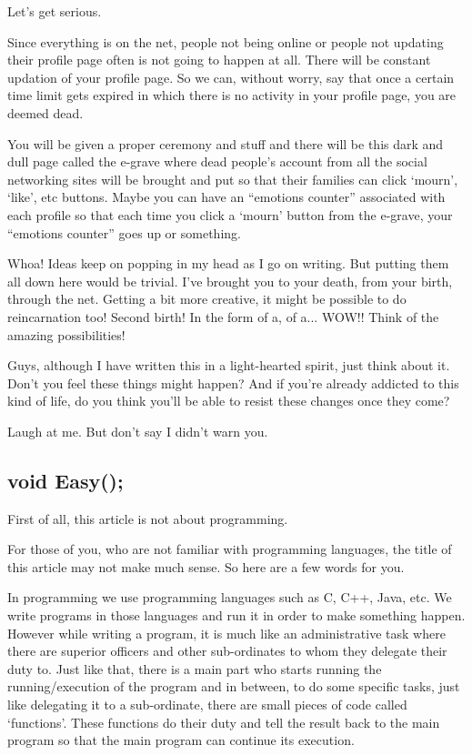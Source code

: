 \documentclass[twoside,11pt,titlepage]{article}
\begin{document}
Let's get serious.

Since everything is on the net, people not being online or people not updating their profile page often is not going to happen at all. There will be constant updation of your profile page. So we can, without worry, say that once a certain time limit gets expired in which there is no activity in your profile page, you are deemed dead.

You will be given a proper ceremony and stuff and there will be this dark and dull page called the e-grave where dead people's account from all the social networking sites will be brought and put so that their families can click `mourn', `like', etc buttons. Maybe you can have an ``emotions counter'' associated with each profile so that each time you click a `mourn' button from the e-grave, your ``emotions counter'' goes up or something.

Whoa! Ideas keep on popping in my head as I go on writing. But putting them all down here would be trivial. I've brought you to your death, from your birth, through the net. Getting a bit more creative, it might be possible to do reincarnation too! Second birth! In the form of a, of a... WOW!! Think of the amazing possibilities!

Guys, although I have written this in a light-hearted spirit, just think about it. Don't you feel these things might happen? And if you're already addicted to this kind of life, do you think you'll be able to resist these changes once they come?

Laugh at me. But don't say I didn't warn you.

\newpage
\begin{center}
  \section{void Easy();}
\end{center}
\bigskip
\bigskip
\bigskip

First of all, this article is not about programming.

For those of you, who are not familiar with programming languages, the title of this article may not make much sense. So here are a few words for you.

In programming we use programming languages such as C, C++, Java, etc. We write programs in those languages and run it in order to make something happen. However while writing a program, it is much like an administrative task where there are superior officers and other sub-ordinates to whom they delegate their duty to. Just like that, there is a main part who starts running the running/execution of the program and in between, to do some specific tasks, just like delegating it to a sub-ordinate, there are small pieces of code called `functions'. These functions do their duty and tell the result back to the main program so that the main program can continue its execution.
\end{document}
